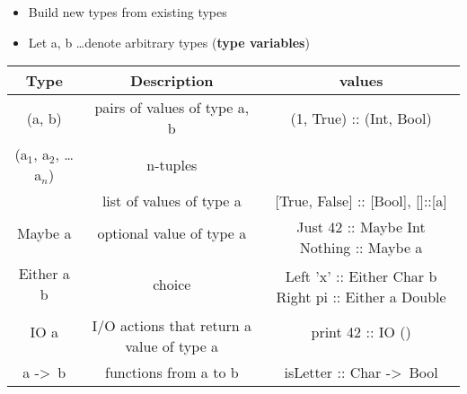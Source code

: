\begin{itemize}
    \item Build new types from existing types
    \item Let a, b \dots denote arbitrary types (\textbf{type variables})
\end{itemize}

\vspace{9pt}\begin{center}\begin{tabular}{|c|c|c|}\hline
\rowcolor{grau}     Type            & Description                                   & values                        \\\hline
                    (a, b)          & pairs of values of type a, b                  & (1, True) :: (Int, Bool)      \\\hline
                    (a$_1$, a$_2$, \dots a$_n$) & n-tuples                          &                               \\\hline
                    [a]             & list of values of type a                      & [True, False] :: [Bool], []::[a]          \\\hline
                    Maybe a         & optional value of type a                      & \multirow{2}{3.7cm}{Just 42 :: Maybe Int 
                                                                                                         Nothing :: Maybe a}    \\
                                    &                                               &                               \\\hline
                    Either a b      & choice                                        & \multirow{2}{5cm}{Left 'x' :: Either Char b
                                                                                                     Right pi :: Either a Double}   \\
                                    &                                               &                               \\\hline
                    IO a            & \multirow{2}{4.2cm}{I/O actions that 
                                                            return a value of type a}   & print 42 :: IO ()             \\
                                    &                                               &                               \\\hline
                    a ->\ b& functions from a to b                       & isLetter :: Char ->\ Bool      \\\hline
\end{tabular}\end{center}\vspace{9pt}


